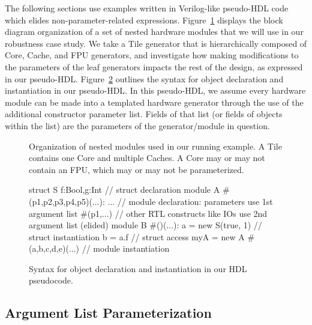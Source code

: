 The following sections use examples written in Verilog-like pseudo-HDL code which elides non-parameter-related expressions.
Figure~\ref{fig:block} displays the block diagram organization of a set of nested hardware modules that we will use in our robustness case study.
We take a Tile generator that is hierarchically composed of Core, Cache, and FPU generators, and investigate how making modifications to the parameters
of the leaf generators impacts the rest of the design, as expressed in our pseudo-HDL.
Figure~\ref{fig:phdl} outlines the syntax for object declaration and instantiation in our pseudo-HDL.
In this pseudo-HDL, we assume every hardware module can be made into a templated hardware generator through the use of the additional \code{\#()} constructor parameter list.
Fields of that list (or fields of objects within the list) are the parameters of the generator/module in question.

\begin{figure}
\centering
{}
\caption[Organization of nested modules used in our running example.]{
Organization of nested modules used in our running example.
A Tile contains one Core and multiple Caches.
A Core may or may not contain an FPU, which may or may not be parameterized.}
\label{fig:block}
\end{figure}

\begin{figure}
\centering
\begin{phdl}
struct S {f:Bool,g:Int}          // struct declaration
module A #(p1,p2,p3,p4,p5)(...): ... 
   // module declaration: parameters use 1st argument list #(p1,...)
   // other RTL constructs like IOs use 2nd argument list (elided)
module B #()(...):
  a = new S(true, 1)             // struct instantiation
  b = a.f                        // struct access
  myA = new A #(a,b,c,d,e)(...)  // module instantiation
\end{phdl} 
\caption{Syntax for object declaration and instantiation in our HDL pseudocode.}
\label{fig:phdl}
\end{figure}

\subsection{Argument List Parameterization}


